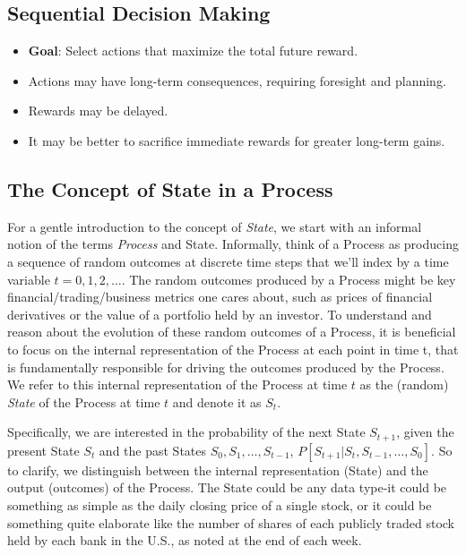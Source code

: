 \subsection{Sequential Decision Making}
\begin{itemize}
    \item \textbf{Goal}: Select actions that maximize the total future reward.
    \item Actions may have long-term consequences, requiring foresight and planning.
    \item Rewards may be delayed.
    \item It may be better to sacrifice immediate rewards for greater long-term gains.
\end{itemize}


\subsection{The Concept of State in a Process}
For a gentle introduction to the concept of \textit{State}, we start with an informal notion of the terms \textit{Process} and State. Informally, think of a Process as producing a sequence of random outcomes at discrete time steps that we’ll index by a time variable $t = 0, 1, 2, \dots$. The random outcomes produced by a Process might be key financial/trading/business metrics one cares about, such as prices of financial derivatives or the value of a portfolio held by an investor. To understand and reason about the evolution of these random outcomes of a Process, it is beneficial to focus on the internal representation of the Process at each point in time t, that is fundamentally responsible for driving the outcomes produced by the Process. We refer to this internal representation of the Process at time $t$ as the (random) \textit{State} of the Process at time $t$ and denote it as $S_t$.

Specifically, we are interested in the probability of the next State $S_{t+1}$, given the present State $S_t$ and the past States $S_0, S_1, \dots, S_{t-1}$, \ie $P[S_{t+1}|S_t, S_{t−1},\dots, S_0]$. So to clarify, we distinguish between the internal representation (State) and the output (outcomes) of the Process. The State could be any data type-it could be something as simple as the daily closing price of a single stock, or it could be something quite elaborate like the number of shares of each publicly traded stock held by each bank in the U.S., as noted at the end of each week.

